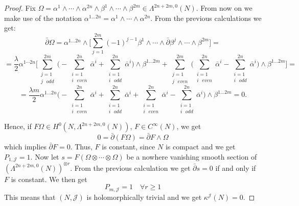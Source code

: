 \documentclass[a4paper, 11pt]{amsart}
\theoremstyle{plain}
\theoremstyle{definition}
\newcommand{\delbar}{\bar{\partial}}
\numberwithin{equation}{section}
\begin{document}
\begin{proof}
    Fix $\Omega = \alpha^{1} \wedge \cdots \wedge \alpha^{2n} \wedge \beta^{1} \wedge \cdots \wedge \beta^{2m} \in \Lambda^{2n+2m,0}(N)$. From now on we make use of the notation $\alpha^{1\ldots 2n} = \alpha^{1} \wedge \cdots \wedge \alpha^{2n}$. From the previous calculations we get:
    \[\delbar\Omega = \alpha^{1\ldots 2n} \wedge \bigl[\sum_{j=1}^{2m}(-1)^{j-1}\beta^{1} \wedge \cdots \wedge \delbar\beta^{j} \wedge \cdots \wedge \beta^{2m}\bigr] = \]
    \[= \frac{\lambda}{2}\alpha^{1\cdots 2n}\bigl[\sum_{\substack{j = 1 \\ j \text{ } odd}}^{2m}\bigl(-\sum_{\substack{i = 1 \\ i \text{ }  even}}^{2n}\bar\alpha^{i} + \sum_{\substack{i = 1 \\ i \text{ } odd}}^{2n}\bar\alpha^{i}\bigr) \wedge \beta^{1\ldots2m} + \sum_{\substack{j = 1 \\ j \text{ } even}}^{2m}\bigl(\sum_{\substack{i = 1 \\ i \text{ }  even}}^{2n}\bar\alpha^{i} - \sum_{\substack{i = 1 \\ i \text{ } odd}}^{2n}\bar\alpha^{i}\bigr) \wedge \beta^{1\ldots 2m}\bigr] = \]
    \[= \frac{\lambda m}{2}\alpha^{1\ldots 2n}\bigl(-\sum_{\substack{i = 1 \\ i \text{ }  even}}^{2n}\bar\alpha^{i} + \sum_{\substack{i = 1 \\ i \text{ }  odd}}^{2n}\bar\alpha^{i} + \sum_{\substack{i = 1 \\ i \text{ }  even}}^{2n}\bar\alpha^{i} - \sum_{\substack{i = 1 \\ i \text{ }  odd}}^{2n}\bar\alpha^{i}\bigr)\wedge \beta^{1\ldots 2m} = 0.\]

    Hence, if $F\Omega \in H^{0}(N, \Lambda^{2n+2m,0}(N))$, $F \in C^{\infty}(N)$, we get 
    \[0 = \delbar(F\Omega) = \delbar F \wedge \Omega\]
    which implies $\delbar F = 0$. Thus, $F$ is constant, since $N$ is compact and we get $P_{1, \mathcal{J}} = 1$.
    Now let $s=F(\Omega \otimes \cdots \otimes \Omega)$ be a nowhere vanishing smooth section of $(\Lambda^{2n+2m,0}(N))^{\otimes r}$. 
    From the previous calculation we get $\delbar s=0$ if and only if $F$ is constant.
    We then get 
    \[P_{m, \mathcal{J}} = 1 \quad \forall r \ge 1\]
    This means that $(N, \mathcal{J})$ is holomorphically trivial and we get $\kappa^{\mathcal{J}}(N) = 0$.
\end{proof}
\end{document}
